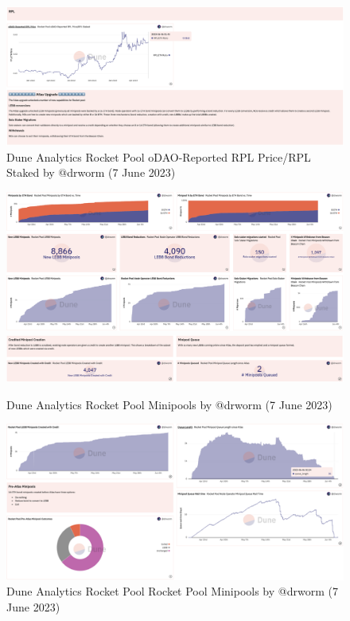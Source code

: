 \documentclass[UTF8]{article}
\begin{document}
\begin{figure}[htbp]
\begin{center}
\includegraphics[width=\linewidth]{images/rocketdrworm9}
\caption{Dune Analytics Rocket Pool oDAO-Reported RPL Price/RPL Staked by @drworm  (7 June 2023)}
\label{fig:rocketdrworm9}
\end{center}
\end{figure}

\begin{figure}[htbp]
\begin{center}
\includegraphics[width=\linewidth]{images/rocketdrworm10}\\
\includegraphics[width=\linewidth]{images/rocketdrworm11}
\caption{Dune Analytics Rocket Pool Minipools by @drworm  (7 June 2023)}
\label{fig:rocketdrworm10}
\end{center}
\end{figure}

\begin{figure}[htbp]
\begin{center}
\includegraphics[width=\linewidth]{images/rocketdrworm12}
\caption{Dune Analytics Rocket Pool Rocket Pool Minipools by @drworm  (7 June 2023)}
\label{fig:rocketdrworm12}
\end{center}
\end{figure}
\end{document}

